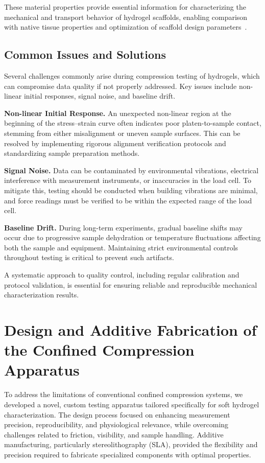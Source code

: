 These material properties provide essential information for characterizing the mechanical and transport behavior of hydrogel scaffolds, enabling comparison with native tissue properties and optimization of scaffold design parameters~\cite{morejon2020compressiveproperties}.

\subsection{Common Issues and Solutions}

Several challenges commonly arise during compression testing of hydrogels, which can compromise data quality if not properly addressed. Key issues include non-linear initial responses, signal noise, and baseline drift.

\textbf{Non-linear Initial Response.} An unexpected non-linear region at the beginning of the stress--strain curve often indicates poor platen-to-sample contact, stemming from either misalignment or uneven sample surfaces. This can be resolved by implementing rigorous alignment verification protocols and standardizing sample preparation methods.

\textbf{Signal Noise.} Data can be contaminated by environmental vibrations, electrical interference with measurement instruments, or inaccuracies in the load cell. To mitigate this, testing should be conducted when building vibrations are minimal, and force readings must be verified to be within the expected range of the load cell.

\textbf{Baseline Drift.} During long-term experiments, gradual baseline shifts may occur due to progressive sample dehydration or temperature fluctuations affecting both the sample and equipment. Maintaining strict environmental controls throughout testing is critical to prevent such artifacts.

A systematic approach to quality control, including regular calibration and protocol validation, is essential for ensuring reliable and reproducible mechanical characterization results.

\section{Design and Additive Fabrication of the Confined Compression Apparatus}

To address the limitations of conventional confined compression systems, we developed a novel, custom testing apparatus tailored specifically for soft hydrogel characterization. The design process focused on enhancing measurement precision, reproducibility, and physiological relevance, while overcoming challenges related to friction, visibility, and sample handling. Additive manufacturing, particularly stereolithography (SLA), provided the flexibility and precision required to fabricate specialized components with optimal properties.

